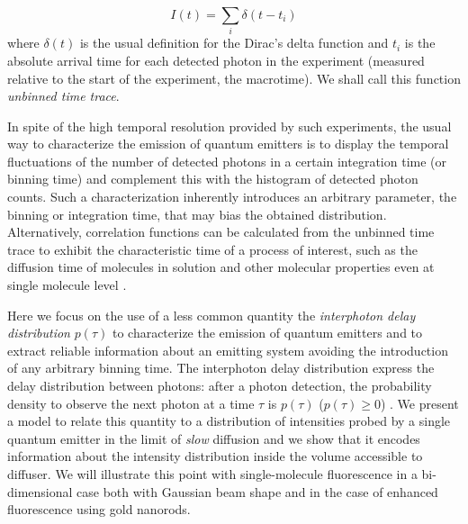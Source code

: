 \begin{equation}
I(t) = \sum_i \delta( t-t_i)
\label{eq:intensity_TCSPC}
\end{equation}
where $\delta(t)$ is the usual definition for the Dirac's delta function and $t_i$ is the absolute arrival time
for each detected photon in the experiment (measured relative to the start of the experiment, the macrotime). 
We shall call this function \textit{unbinned time trace}. 
 


In spite of the high temporal resolution provided by such experiments, 
the usual way to characterize the emission of quantum emitters is to 
display the temporal fluctuations of the number of detected photons 
in a certain integration time (or binning time) and
complement this with the histogram of detected photon counts. 
Such a characterization inherently introduces an arbitrary parameter, 
the binning or integration time, that may bias the obtained distribution\cite{Lippitz2005}. 
Alternatively, correlation functions can be calculated from the unbinned
 time trace to exhibit the characteristic 
time of a process of interest, such as the diffusion time of molecules
in solution\cite{magde1972thermodynamic,haustein2007fluorescence} and 
other molecular properties even at single molecule level \cite{medina2002fluorescence}.

Here we focus on the use of a less common quantity the 
\textit{interphoton delay distribution} $p(\tau)$
to characterize the emission of quantum emitters and to extract reliable 
information about an emitting system avoiding the introduction of any arbitrary 
binning time. The interphoton delay distribution express the delay distribution 
between photons: after a photon detection, the probability density to observe 
the next photon at a time $\tau$ is $p(\tau)$ ($p(\tau)\geq 0$) \cite{Verberk2003}.
We present a model to relate this quantity to a distribution of intensities probed by a 
single quantum emitter in the limit of \textit{slow} diffusion and we show that it 
encodes information about the intensity distribution inside the volume accessible 
to diffuser. We will illustrate this point with single-molecule fluorescence 
in a bi-dimensional case both with Gaussian beam shape and in the case of 
enhanced fluorescence using gold nanorods.


